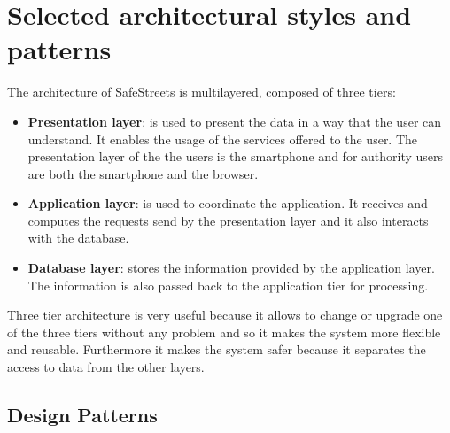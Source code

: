     \section{Selected architectural styles and patterns}  
    The architecture of SafeStreets is multilayered, composed of three tiers:
    \begin{itemize}
        \item \textbf{Presentation layer}: is used to present the data in a way
        that the user can understand. It enables the usage of the services
        offered to the user. The presentation layer of the the users is the
        smartphone and for authority users are both the smartphone and the browser.
        \item \textbf{Application layer}: is used to coordinate the application.
        It receives and computes the requests send by the presentation layer and
        it also interacts with the database.
        \item \textbf{Database layer}: stores the information provided by the
        application layer. The information is also passed back to the
        application tier for processing.
    \end{itemize}    
    Three tier architecture is very useful because it allows to change or upgrade
    one of the three tiers without any problem and so it makes the system more
    flexible and reusable. Furthermore it makes the system safer because it
    separates the access to data from the other layers.
  
        \subsection{Design Patterns}
